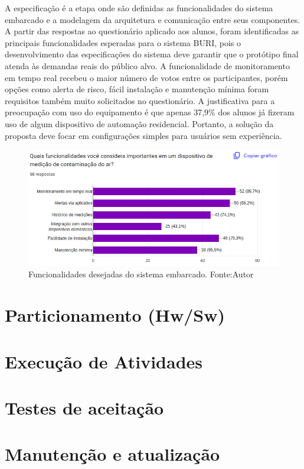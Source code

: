 A especificação é a etapa onde são definidas as funcionalidades do sistema embarcado e a modelagem da arquitetura e comunicação entre 
seus componentes. A partir das respostas ao questionário aplicado aos alunos, foram identificadas as principais funcionalidades esperadas 
para o sistema BURI, pois o desenvolvimento das especificações do sistema deve garantir que o protótipo final atenda às demandas reais do
público alvo. A funcionalidade de monitoramento em tempo real recebeu o maior número de votos entre os participantes, porém opções como alerta de risco, fácil instalação e 
manutenção mínima foram requisitos também muito solicitados no questionário. A justificativa para a preocupação com uso do equipamento é que apenas 37,9\% dos alunos já fizeram uso de 
algum dispositivo de automação residencial. Portanto, a solução da proposta deve focar em configurações simples para usuários sem experiência.
\begin{figure}[ht]
    \centering
    \includegraphics[width=.77\textwidth]{img/graf1-funcionalidades.png}
    \caption{Funcionalidades desejadas do sistema embarcado. Fonte:Autor}\label{figFuncionalidades}
\end{figure}

\section{Particionamento (Hw/Sw)}\label{fase3}

\section{Execução de Atividades}\label{fase4}

\section{Testes de aceitação}\label{fase5}

\section{Manutenção e atualização}\label{fase6}